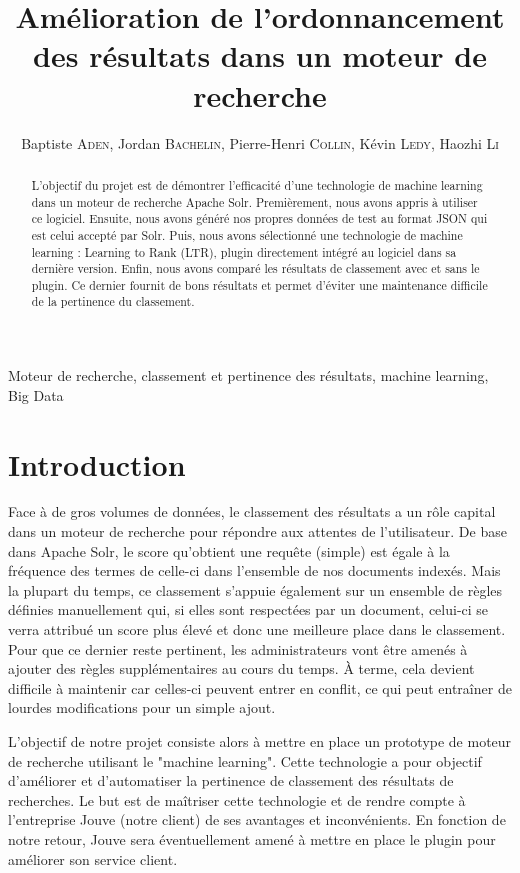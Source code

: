 \documentclass[twocolumn,a4paper]{IEEEtranfr}
\title{Amélioration de l'ordonnancement des résultats dans un moteur de recherche}
\author{Baptiste \textsc{Aden}, Jordan \textsc{Bachelin}, Pierre-Henri \textsc{Collin}, Kévin \textsc{Ledy}, Haozhi \textsc{Li}}
\begin{document}
\maketitle

\begin{abstract}
L'objectif du projet est de démontrer l'efficacité d'une technologie de machine learning dans un moteur de recherche Apache Solr. Premièrement, nous avons appris à utiliser ce logiciel. Ensuite, nous avons généré nos propres données de test au format JSON qui est celui accepté par Solr. Puis, nous avons sélectionné une technologie de machine learning : Learning to Rank (LTR), plugin directement intégré au logiciel dans sa dernière version. Enfin, nous avons comparé les résultats de classement avec et sans le plugin. Ce dernier fournit de bons résultats et permet d'éviter une maintenance difficile de la pertinence du classement.
\end{abstract} 

\begin{keywords}
Moteur de recherche, classement et pertinence des résultats, machine learning, Big Data
\end{keywords}

\section{Introduction}
Face à de gros volumes de données, le classement des résultats a un rôle capital dans un moteur de recherche pour répondre aux attentes de l'utilisateur. De base dans Apache Solr, le score qu'obtient une requête (simple) est égale à la fréquence des termes de celle-ci dans l'ensemble de nos documents indexés\cite{docTFIDF}. Mais la plupart du temps, ce classement s'appuie également sur un ensemble de règles définies manuellement qui, si elles sont respectées par un document, celui-ci se verra attribué un score plus élevé et donc une meilleure place dans le classement. Pour que ce dernier reste pertinent, les administrateurs vont être amenés à ajouter des règles supplémentaires au cours du temps. À terme, cela devient difficile à maintenir car celles-ci peuvent entrer en conflit, ce qui peut entraîner de lourdes modifications pour un simple ajout.

L'objectif de notre projet consiste alors à mettre en place un prototype de moteur de recherche utilisant le "machine learning". Cette technologie a pour objectif d'améliorer et d'automatiser la pertinence de classement des résultats de recherches. Le but est de maîtriser cette technologie et de rendre compte à l'entreprise Jouve (notre client) de ses avantages et inconvénients. En fonction de notre retour, Jouve sera éventuellement amené à mettre en place le plugin pour améliorer son service client.
\end{document}
